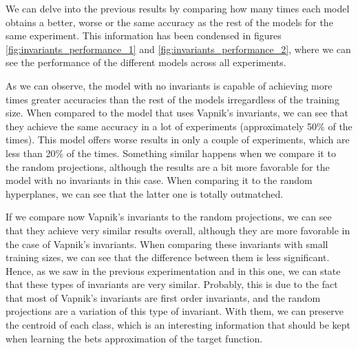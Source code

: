 \begin{table}[h]
\centering
{}
\caption{Mean accuracy and standard deviation for each type of invariant in each problem considering the results for subsamples of 10\% of the training data. The results are expressed as percentages.}
\label{tab:results_accuracies_errors_10}
\end{table}

We can delve into the previous results by comparing how many times each model obtains a better, worse
or the same accuracy as the rest of the models for the same experiment. This information has been
condensed in figures \ref{fig:invariants_performance_1} and \ref{fig:invariants_performance_2}, where we
can see the performance of the different models across all experiments.

As we can observe, the model with no invariants is capable of achieving more times greater accuracies than
the rest of the models irregardless of the training size. When compared to the model that uses Vapnik's invariants,
we can see that they achieve the same accuracy in a lot of experiments (approximately 50\% of the times). This
model offers worse results in only a couple of experiments, which are less than 20\% of the times. Something similar
happens when we compare it to the random projections, although the results are a bit more favorable for the model
with no invariants in this case. When comparing it to the random hyperplanes, we can see that the latter one
is totally outmatched.

If we compare now Vapnik's invariants to the random projections, we can see that they achieve very similar
results overall, although they are more favorable in the case of Vapnik's invariants. When comparing
these invariants with small training sizes, we can see that the difference between them is less significant.
Hence, as we saw in the previous experimentation and in this one, we can state that these types of invariants are
very similar. Probably, this is due to the fact that most of Vapnik's invariants are first order invariants,
and the random projections are a variation of this type of invariant. With them, we can preserve the centroid of
each class, which is an interesting information that should be kept when learning the bets approximation of the
target function.

